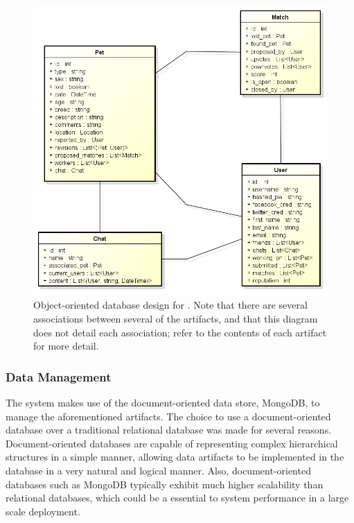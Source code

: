 \begin{figure}[htbp]
    \begin{center}
	\includegraphics[width=150mm]{figs/artifacts.png}
    \end{center}
        \caption[Database Design]{
        Object-oriented database design for \nplh{}.  Note that there are several associations between several of the artifacts, and that this diagram does not detail each association; refer to the contents of each artifact for more detail.
	}
	 \label{fig:db}
\end{figure}

\subsubsection {Data Management}

The system makes use of the document-oriented data store, MongoDB, to manage the aforementioned artifacts.  The choice to use a document-oriented database over a traditional relational database was made for several reasons.  Document-oriented databases are capable of representing complex hierarchical structures in a simple manner, allowing data artifacts to be implemented in the database in a very natural and logical manner.  Also, document-oriented databases such as MongoDB typically exhibit much higher scalability than relational databases, which could be a essential to system performance in a large scale deployment.  

